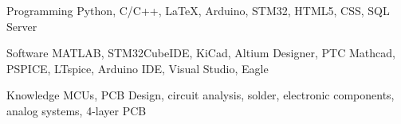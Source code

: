 


\begin{cvskills}


\cvskill
{Programming} %
{Python, C/C++, LaTeX, Arduino, STM32, HTML5, CSS, SQL Server} %


\cvskill
{Software} %
{MATLAB, STM32CubeIDE, KiCad, Altium Designer, PTC Mathcad, PSPICE, LTspice, Arduino IDE, Visual Studio, Eagle} %

\cvskill
{Knowledge} %
{MCUs, PCB Design, circuit analysis, solder, electronic components, analog systems, 4-layer PCB}


\end{cvskills}